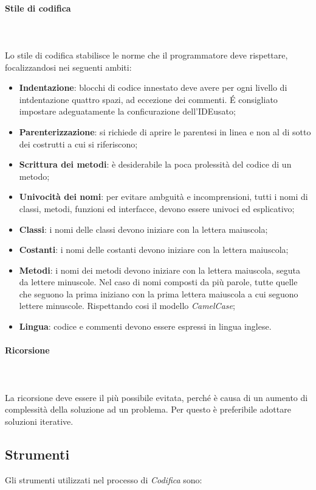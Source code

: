 		\paragraph{Stile di codifica} \mbox{} \\ \mbox{} \\
		Lo stile di codifica stabilisce le norme che il programmatore deve rispettare, focalizzandosi nei seguenti ambiti:
		\begin{itemize}
			\item \textbf{Indentazione}: blocchi di codice innestato deve avere per ogni livello di intdentazione quattro spazi, ad eccezione dei commenti. \'E consigliato impostare adeguatamente la conficurazione dell'IDE\glo usato;
			\item \textbf{Parenterizzazione}: si richiede di aprire le parentesi in linea e non al di sotto dei costrutti a cui si riferiscono;
			\item \textbf{Scrittura dei metodi}: è desiderabile la poca prolessità del codice di un metodo;
			\item \textbf{Univocità dei nomi}: per evitare ambguità e incomprensioni, tutti i nomi di classi, metodi, funzioni ed interfacce, devono essere univoci ed esplicativo;
			\item \textbf{Classi}: i nomi delle classi devono iniziare con la lettera maiuscola;
			\item \textbf{Costanti}: i nomi delle costanti devono iniziare con la lettera maiuscola;
			\item \textbf{Metodi}: i nomi dei metodi devono iniziare con la lettera maiuscola, seguta da lettere minuscole. Nel caso di nomi composti da più parole, tutte quelle che seguono la prima iniziano con la prima lettera maiuscola a cui seguono lettere minuscole. Rispettando cosi il modello \textit{CamelCase}\glo;
			\item \textbf{Lingua}: codice e commenti devono essere espressi in lingua inglese.
		\end{itemize}
		\paragraph{Ricorsione} \mbox{} \\ \mbox{} \\
		La ricorsione deve essere il più possibile evitata, perché è causa di un aumento di complessità della soluzione ad un problema. Per questo è preferibile adottare soluzioni iterative.
	\subsection{Strumenti}
	Gli strumenti utilizzati nel processo di \textit{Codifica} sono:

